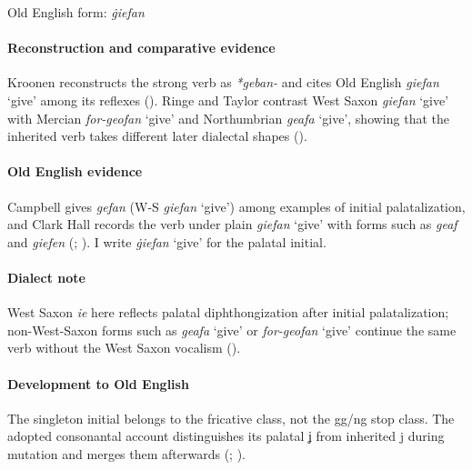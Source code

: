 \documentclass[
  british,
  a4paper,
]{article}
\begin{document}
Old English form: \emph{ġiefan}

\paragraph{Reconstruction and comparative
evidence}\label{reconstruction-and-comparative-evidence-27}

Kroonen reconstructs the strong verb as \emph{*geban-} and cites Old
English {\emph{giefan}} `give' among its reflexes
(). Ringe and Taylor contrast
West Saxon \emph{giefan} `give' with Mercian \emph{for-geofan} `give'
and Northumbrian \emph{geafa} `give', showing that the inherited verb
takes different later dialectal shapes
().

\paragraph{Old English evidence}\label{old-english-evidence-27}

Campbell gives \emph{gefan} (W-S \emph{giefan} `give') among examples of
initial palatalization, and Clark Hall records the verb under plain
\emph{giefan} `give' with forms such as \emph{geaf} and \emph{giefen}
(;
). I write \emph{ġiefan}
`give' for the palatal initial.

\paragraph{Dialect note}\label{dialect-note}

West Saxon \emph{ie} here reflects palatal diphthongization after
initial palatalization; non-West-Saxon forms such as \emph{geafa} `give'
or \emph{for-geofan} `give' continue the same verb without the West
Saxon vocalism ().

\paragraph{Development to Old
English}\label{development-to-old-english-27}

The singleton initial belongs to the fricative class, not the gg/ng stop
class. The adopted consonantal account distinguishes its palatal ʝ from
inherited j during mutation and merges them afterwards
(;
).
\end{document}

